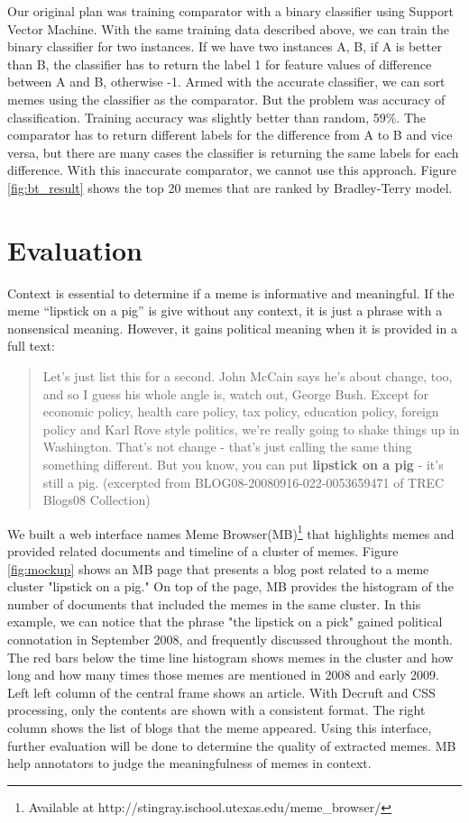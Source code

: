 \documentclass{sig-alternate}
\begin{document}
Our original plan was training comparator with a binary classifier using Support Vector Machine. With the same training data described above, we can train the binary classifier for two instances. If we have two instances A, B, if A is better than B, the classifier has to return the label 1 for feature values of difference between A and B, otherwise -1. Armed with the accurate classifier, we can sort memes using the classifier as the comparator. But the problem was accuracy of classification. Training accuracy was slightly better than random, 59\%. The comparator has to return different labels for the difference from A to B and vice versa, but there are many cases the classifier is returning the same labels for each difference. With this inaccurate comparator, we cannot use this approach. Figure \ref{fig:bt_result} shows the top 20 memes that are ranked by Bradley-Terry model.

\section{Evaluation}

Context is essential to determine if a meme is informative and meaningful. If the meme ``lipstick on a pig'' is give without any context, it is just a phrase with a nonsensical meaning. However, it gains political meaning when it is provided in a full text: 
\begin{quote}
Let's just list this for a second. John McCain says he's about change, too, and so I guess his whole angle is, watch out, George Bush. Except for economic policy, health care policy, tax policy, education policy, foreign policy and Karl Rove style politics, we're really going to shake things up in Washington. That's not change - that's just calling the same thing something different. But you know, you can put \textbf{lipstick on a pig} - it's still a pig. (excerpted from BLOG08-20080916-022-0053659471 of TREC Blogs08 Collection)
\end{quote}

We built a web interface names Meme Browser(MB)\footnote{Available at http://stingray.ischool.utexas.edu/meme\_browser/} that highlights memes and provided related documents and timeline of a cluster of memes. Figure \ref{fig:mockup} shows an MB page that presents a blog post related to a meme cluster "lipstick on a pig." On top of the page, MB provides the histogram of the number of documents that included the memes in the same cluster. In this example, we can notice that the phrase "the lipstick on a pick" gained political connotation in September 2008, and frequently discussed throughout the month. The red bars below the time line histogram shows memes in the cluster and how long  and how many times those memes are mentioned in 2008 and early 2009. Left left column of the central frame shows an article. With Decruft and CSS processing, only the contents are shown with a consistent format. The right column shows the list of blogs that the meme appeared. Using this interface, further evaluation will be done to determine the quality of extracted memes. MB help annotators to judge the meaningfulness of memes in context.
\end{document}
